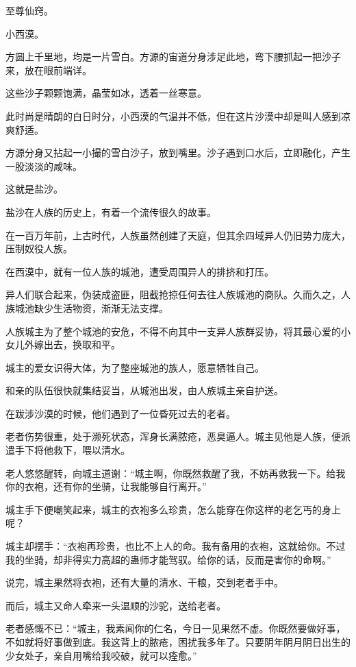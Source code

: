 
\begin{this_body}

至尊仙窍。

小西漠。

方圆上千里地，均是一片雪白。方源的宙道分身涉足此地，弯下腰抓起一把沙子来，放在眼前端详。

这些沙子颗颗饱满，晶莹如冰，透着一丝寒意。

此时尚是晴朗的白日时分，小西漠的气温并不低，但在这片沙漠中却是叫人感到凉爽舒适。

方源分身又拈起一小撮的雪白沙子，放到嘴里。沙子遇到口水后，立即融化，产生一股淡淡的咸味。

这就是盐沙。

盐沙在人族的历史上，有着一个流传很久的故事。

在一百万年前，上古时代，人族虽然创建了天庭，但其余四域异人仍旧势力庞大，压制奴役人族。

在西漠中，就有一位人族的城池，遭受周围异人的排挤和打压。

异人们联合起来，伪装成盗匪，阻截抢掠任何去往人族城池的商队。久而久之，人族城池缺少生活物资，渐渐无法支撑。

人族城主为了整个城池的安危，不得不向其中一支异人族群妥协，将其最心爱的小女儿外嫁出去，换取和平。

城主的爱女识得大体，为了整座城池的族人，愿意牺牲自己。

和亲的队伍很快就集结妥当，从城池出发，由人族城主亲自护送。

在跋涉沙漠的时候，他们遇到了一位昏死过去的老者。

老者伤势很重，处于濒死状态，浑身长满脓疮，恶臭逼人。城主见他是人族，便派遣手下将他救下，喂以清水。

老人悠悠醒转，向城主道谢：“城主啊，你既然救醒了我，不妨再救我一下。给我你的衣袍，还有你的坐骑，让我能够自行离开。”

城主手下便嘲笑起来，城主的衣袍多么珍贵，怎么能穿在你这样的老乞丐的身上呢？

城主却摆手：“衣袍再珍贵，也比不上人的命。我有备用的衣袍，这就给你。不过我的坐骑，却非得实力高超的蛊师才能驾驭。给你的话，反而是害你的命啊。”

说完，城主果然将衣袍，还有大量的清水、干粮，交到老者手中。

而后，城主又命人牵来一头温顺的沙驼，送给老者。

老者感慨不已：“城主，我素闻你的仁名，今日一见果然不虚。你既然要做好事，不如就将好事做到底。我这背上的脓疮，困扰我多年了。只要阴年阴月阴日出生的少女处子，亲自用嘴给我咬破，就可以痊愈。”


\end{this_body}
